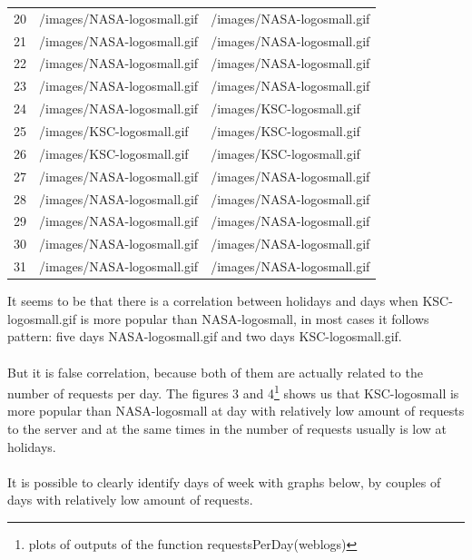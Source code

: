 \documentclass[english]{article}
\begin{document}
\begin{table}[H]
{\begin{tabular}{lll}
20&/images/NASA-logosmall.gif&/images/NASA-logosmall.gif\\
21&/images/NASA-logosmall.gif&/images/NASA-logosmall.gif\\
22&/images/NASA-logosmall.gif&/images/NASA-logosmall.gif\\
23&/images/NASA-logosmall.gif&/images/NASA-logosmall.gif\\
24&/images/NASA-logosmall.gif&/images/KSC-logosmall.gif\\
25&/images/KSC-logosmall.gif&/images/KSC-logosmall.gif\\
26&/images/KSC-logosmall.gif&/images/KSC-logosmall.gif\\
27&/images/NASA-logosmall.gif&/images/NASA-logosmall.gif\\
28&/images/NASA-logosmall.gif&/images/NASA-logosmall.gif\\
29&/images/NASA-logosmall.gif&/images/NASA-logosmall.gif\\
30&/images/NASA-logosmall.gif&/images/NASA-logosmall.gif\\
31&/images/NASA-logosmall.gif&/images/NASA-logosmall.gif\\
\end{tabular}}
\end{table}


It seems to be that there is a correlation between holidays and days when KSC-logosmall.gif is more popular than NASA-logosmall, in most cases it follows pattern: five days NASA-logosmall.gif and two days KSC-logosmall.gif. \\\\
But it is false correlation, because both of them are actually related to the number of requests per day. The figures 3 and 4\footnote{plots of outputs of the function requestsPerDay(weblogs)} shows us that KSC-logosmall is more popular than NASA-logosmall at day with relatively low amount of requests to the server and at the same times in the number of requests usually is low at holidays.\\\\
It is possible to clearly identify days of week with graphs below, by couples of days with relatively low amount of requests.
\end{document}
